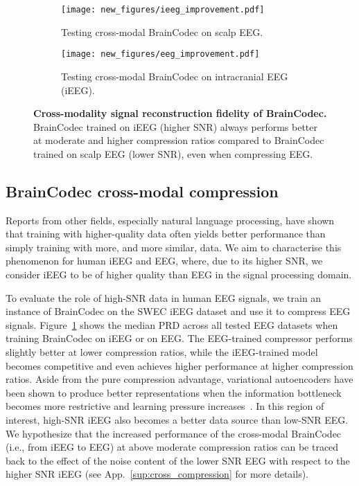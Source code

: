 \documentclass{article} %
\begin{document}
\begin{figure}[ht]
\begin{subfigure}[t]{.49\textwidth}
    \centering
    \texttt{[image: new\_figures/ieeg\_improvement.pdf]}
    \caption{Testing cross-modal BrainCodec on scalp EEG.}
    \label{fig:results_cross}
\end{subfigure}\hfill
\begin{subfigure}[t]{.49\textwidth}
    \centering
    \texttt{[image: new\_figures/eeg\_improvement.pdf]}
    \caption{Testing cross-modal BrainCodec on intracranial EEG (iEEG).}
    \label{fig:results_cross_conv}
\end{subfigure}
\caption{\textbf{Cross-modality signal reconstruction fidelity of BrainCodec.} BrainCodec trained on iEEG (higher SNR) always performs better at moderate and higher compression ratios compared to BrainCodec trained on scalp EEG (lower SNR), even when compressing EEG.}
\end{figure}

\subsection{BrainCodec cross-modal compression}

Reports from other fields, especially natural language processing, have shown~\citep{Lee2022a,Muennighoff2023,Gunasekar2023} that training with higher-quality data often yields better performance than simply training with more, and more similar, data. We aim to characterise this phenomenon for human iEEG and EEG, where, due to its higher SNR, we consider iEEG to be of higher quality than EEG in the signal processing domain.

To evaluate the role of high-SNR data in human EEG signals, we train an instance of BrainCodec on the SWEC iEEG dataset and use it to compress EEG signals. Figure~\ref{fig:results_cross} shows the median PRD across all tested EEG datasets when training BrainCodec on iEEG or on EEG. The EEG-trained compressor performs slightly better at lower compression ratios, while the iEEG-trained model becomes competitive and even achieves higher performance at higher compression ratios. Aside from the pure compression advantage, variational autoencoders have been shown to produce better representations when the information bottleneck becomes more restrictive and learning pressure increases~\citep{Burgess2018}. In this region of interest, high-SNR iEEG also becomes a better data source than low-SNR EEG. We hypothesize that the increased performance of the cross-modal BrainCodec (i.e., from iEEG to EEG) at above moderate compression ratios can be traced back to the effect of the noise content of the lower SNR EEG with respect to the higher SNR iEEG (see App.~\ref{sup:cross_compression} for more details).
\end{document}
